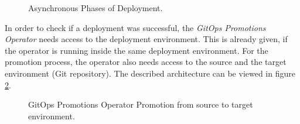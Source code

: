 \begin{figure}[h]
	\centering
	\caption{Asynchronous Phases of Deployment.} \label{tikz:async-phases-deploy}
\end{figure}


In order to check if a deployment was successful,
the \textit{GitOps Promotions Operator} needs access to the deployment environment. This is already given,
if the operator is running inside the same deployment environment.
For the promotion process, the operator also needs access
to the source and the target
environment (Git repository).
The described architecture can be viewed in figure \ref{fig:operator-access-source-target-envs}.

\begin{figure}[h]
	\centering
	\caption{GitOps Promotions Operator Promotion from source to target environment.
	}
	\label{fig:operator-access-source-target-envs}	
\end{figure}

